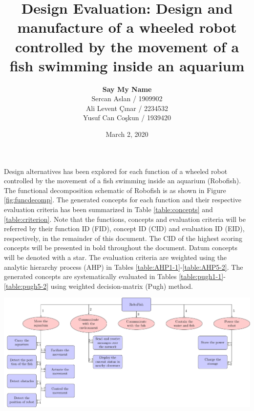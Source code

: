 \documentclass[a4paper, 10pt, DIV=16, parskip = full, twocolumn = true]{scrartcl}
\title{Design Evaluation: Design and manufacture of a wheeled robot controlled by the movement of a fish swimming inside an aquarium}
\author{\textbf{Say My Name} \\ Sercan Aslan / 1909902 \\ Ali Levent Çınar / 2234532 \\ Yusuf Can Coşkun / 1939420}
\date{March 2, 2020}
\begin{document}
	\maketitle
	\thispagestyle{scrheadings}


Design alternatives has been explored for each function of a wheeled robot controlled by the movement of a fish swimming inside an aquarium (Robofish). The functional decomposition schematic of Robofish is as shown in Figure \ref{fig:funcdecomp}. The generated concepts for each function and their respective evaluation criteria has been summarized in Table \ref{table:concepts} and \ref{table:criterion}. Note that the functions, concepts and evaluation criteria will be referred by their function ID (FID), concept ID (CID) and evaluation ID (EID), respectively, in the remainder of this document. The CID of the highest scoring concepts will be presented in bold throughout the document. Datum concepts will be denoted with a star. The evaluation criteria are weighted using the analytic hierarchy process (AHP) in Tables \ref{table:AHP1-1}-\ref{table:AHP5-2}. The generated concepts are systematically evaluated in Tables \ref{table:pugh1-1}-\ref{table:pugh5-2} using weighted decision-matrix (Pugh) method.

\begin{strip}
	\break\break\break
	\centering
	\includegraphics[width=0.8\pagewidth]{../functional_decomposition/functional_decomposition.pdf}
	\label{fig:funcdecomp}
\end{strip}
\end{document}

